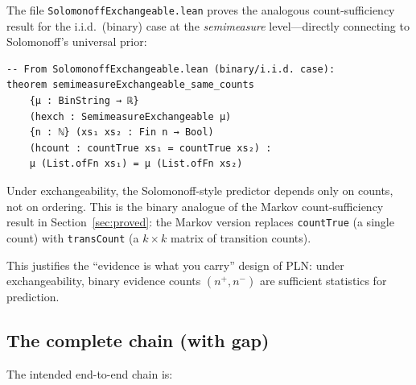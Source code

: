 \documentclass[11pt]{article}
\theoremstyle{definition}
\newcommand{\lean}[1]{\texttt{#1}}
\begin{document}
The file \lean{SolomonoffExchangeable.lean} proves the analogous
count-sufficiency result for the i.i.d.\ (binary) case at the
\emph{semimeasure} level---directly connecting to Solomonoff's
universal prior:

\begin{lstlisting}
-- From SolomonoffExchangeable.lean (binary/i.i.d. case):
theorem semimeasureExchangeable_same_counts
    {μ : BinString → ℝ}
    (hexch : SemimeasureExchangeable μ)
    {n : ℕ} (xs₁ xs₂ : Fin n → Bool)
    (hcount : countTrue xs₁ = countTrue xs₂) :
    μ (List.ofFn xs₁) = μ (List.ofFn xs₂)
\end{lstlisting}

Under exchangeability, the Solomonoff-style predictor depends only on
counts, not on ordering.  This is the binary analogue of the Markov
count-sufficiency result in Section~\ref{sec:proved}: the Markov version
replaces \lean{countTrue} (a single count) with \lean{transCount}
(a $k \times k$ matrix of transition counts).

This justifies the ``evidence is what you carry'' design of PLN:
under exchangeability, binary evidence counts $(n^+, n^-)$ are
sufficient statistics for prediction.

\subsection{The complete chain (with gap)}

The intended end-to-end chain is:
\end{document}
